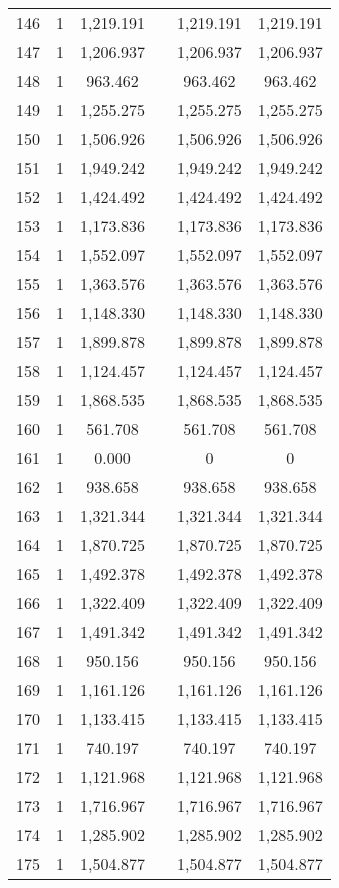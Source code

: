 \begin{table}[!htbp]
\begin{tabular}{@{\extracolsep{5pt}}lccccc}
146 & 1 & 1,219.191 &  & 1,219.191 & 1,219.191 \\ 
147 & 1 & 1,206.937 &  & 1,206.937 & 1,206.937 \\ 
148 & 1 & 963.462 &  & 963.462 & 963.462 \\ 
149 & 1 & 1,255.275 &  & 1,255.275 & 1,255.275 \\ 
150 & 1 & 1,506.926 &  & 1,506.926 & 1,506.926 \\ 
151 & 1 & 1,949.242 &  & 1,949.242 & 1,949.242 \\ 
152 & 1 & 1,424.492 &  & 1,424.492 & 1,424.492 \\ 
153 & 1 & 1,173.836 &  & 1,173.836 & 1,173.836 \\ 
154 & 1 & 1,552.097 &  & 1,552.097 & 1,552.097 \\ 
155 & 1 & 1,363.576 &  & 1,363.576 & 1,363.576 \\ 
156 & 1 & 1,148.330 &  & 1,148.330 & 1,148.330 \\ 
157 & 1 & 1,899.878 &  & 1,899.878 & 1,899.878 \\ 
158 & 1 & 1,124.457 &  & 1,124.457 & 1,124.457 \\ 
159 & 1 & 1,868.535 &  & 1,868.535 & 1,868.535 \\ 
160 & 1 & 561.708 &  & 561.708 & 561.708 \\ 
161 & 1 & 0.000 &  & 0 & 0 \\ 
162 & 1 & 938.658 &  & 938.658 & 938.658 \\ 
163 & 1 & 1,321.344 &  & 1,321.344 & 1,321.344 \\ 
164 & 1 & 1,870.725 &  & 1,870.725 & 1,870.725 \\ 
165 & 1 & 1,492.378 &  & 1,492.378 & 1,492.378 \\ 
166 & 1 & 1,322.409 &  & 1,322.409 & 1,322.409 \\ 
167 & 1 & 1,491.342 &  & 1,491.342 & 1,491.342 \\ 
168 & 1 & 950.156 &  & 950.156 & 950.156 \\ 
169 & 1 & 1,161.126 &  & 1,161.126 & 1,161.126 \\ 
170 & 1 & 1,133.415 &  & 1,133.415 & 1,133.415 \\ 
171 & 1 & 740.197 &  & 740.197 & 740.197 \\ 
172 & 1 & 1,121.968 &  & 1,121.968 & 1,121.968 \\ 
173 & 1 & 1,716.967 &  & 1,716.967 & 1,716.967 \\ 
174 & 1 & 1,285.902 &  & 1,285.902 & 1,285.902 \\ 
175 & 1 & 1,504.877 &  & 1,504.877 & 1,504.877 \\ 

\end{tabular}
\end{table}
